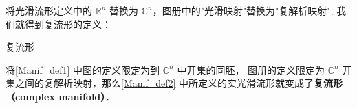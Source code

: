 

将光滑流形定义中的 $\mathbb{R}^n$ 替换为 $\mathbb{C}^n$，图册中的"光滑映射"替换为"复解析映射", 我们就得到复流形的定义：

\begin{definition}{复流形}

将\autoref{Manif_def1} 中图的定义限定为到 $\mathbb{C}^n$ 中开集的同胚， 图册的定义限定为 $\mathbb{C}^n$ 开集之间的复解析映射，那么\autoref{Manif_def2} 中所定义的实光滑流形就变成了\textbf{复流形（complex manifold）}．

\end{definition}
